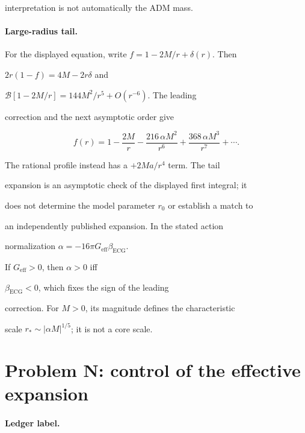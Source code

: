 interpretation is not automatically the ADM mass.





\paragraph{Large-radius tail.} \label{detail:sec-H-paragraphlargeradiustail-44}

For the displayed equation, write \(f=1-2M/r+\delta(r)\). Then

\(2r(1-f)=4M-2r\delta\) and

\(\mathcal B[1-2M/r]=144M^2/r^5+O(r^{-6})\). The leading

correction and the next asymptotic order give

\[

f(r)=1-\frac{2M}{r}-\frac{216\,\alpha M^2}{r^6}

+\frac{368\,\alpha M^3}{r^7}+\cdots .

\]

The rational profile instead has a \(+2Ma/r^4\) term. The tail

expansion is an asymptotic check of the displayed first integral; it

does not determine the model parameter \(r_0\) or establish a match to

an independently published expansion. In the stated action

normalization \(\alpha=-16\pi G_{\mathrm{eff}}\beta_{\mathrm{ECG}}\).

If \(G_{\mathrm{eff}}>0\), then \(\alpha>0\) iff

\(\beta_{\mathrm{ECG}}<0\), which fixes the sign of the leading

correction. For \(M>0\), its magnitude defines the characteristic

scale \(r_*\sim|\alpha M|^{1/5}\); it is not a core scale.







\section{Problem N: control of the effective expansion}

\label{sec:detailed-Problem N: control of the effective expansion}



\paragraph{Ledger label.} \label{detail:sec-N-paragraphledgerlabel-45}

